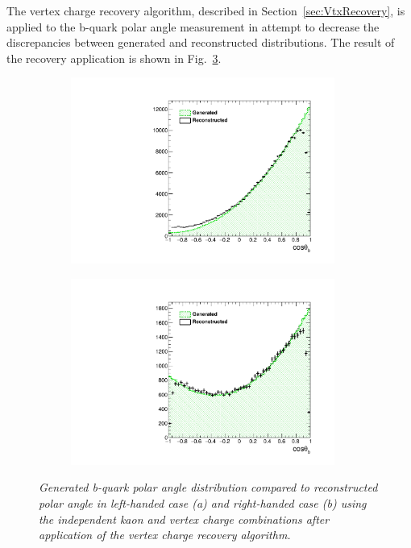 The vertex charge recovery algorithm, described in Section~\ref{sec:VtxRecovery}, is applied to the b-quark polar angle measurement in attempt to decrease the discrepancies between generated and reconstructed distributions.
The result of the recovery application is shown in Fig.~\ref{fig:BAsymmetryRec_3}.
\begin{figure}
	\centering
	\begin{subfigure}{0.5\textwidth}
		\includegraphics[width=0.95\textwidth]{ILD/plots/basymmetry-rec-nocorr-nobkg-left.pdf}
		\caption{\label{fig:BAsymmetryRec_a_3} }
	\end{subfigure}%
	\begin{subfigure}{0.5\textwidth}
		\centering
		\includegraphics[width=0.95\textwidth]{ILD/plots/basymmetry-rec-nocorr-nobkg-right.pdf}
		\caption{\label{fig:BAsymmetryRec_b_3} }
	\end{subfigure}
	\caption{\sl Generated b-quark polar angle distribution compared to reconstructed polar angle in left-handed case (a) and right-handed case (b) using the independent kaon and vertex charge combinations after application of the vertex charge recovery algorithm. }
	\label{fig:BAsymmetryRec_3}
\end{figure}
